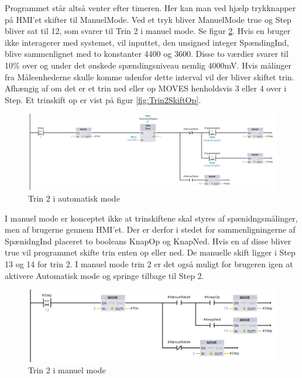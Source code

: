 Programmet står altså venter efter timeren. Her kan man ved hjælp trykknapper på HMI'et skifter til ManuelMode. Ved et tryk bliver ManuelMode true og Step bliver sat til 12, som svarer til Trin 2 i manuel mode. Se figur \ref{fig:Trin2ManuelMode}. Hvis en bruger ikke interagerer med systemet, vil inputtet, den unsigned integer SpændingInd, blive sammenlignet med to konstanter 4400 og 3600. Disse to værdier svarer til 10\% over og under det ønskede spændingsniveau nemlig 4000mV. Hvis målinger fra Måleenhederne skulle komme udenfor dette interval vil der bliver skiftet trin. Afhængig af om det er et trin ned eller op MOVES henholdsvis 3 eller 4 over i Step.
Et trinskift op er vist på figur \ref{fig:Trin2SkiftOp}.

\begin{figure}[H] %
	\centering
	\includegraphics[width=1\textwidth]{Figure/Trin2AutomatiskMode}
	\caption{Trin 2 i automatisk mode}
	\label{fig:Trin2AutomatiskMode}
\end{figure}

I manuel mode er konceptet ikke at trinskiftene skal styres af spænidngsmålinger, men af brugerne gennem HMI'et. Der er derfor i stedet for sammenligningerne af SpænidngInd placeret to booleans KnapOp og KnapNed. Hvis en af disse bliver true vil programmet skifte trin enten op eller ned. De manuelle skift ligger i Step 13 og 14 for trin 2. I manuel mode trin 2 er det også muligt for brugeren igen at aktivere Automatisk mode og springe tilbage til Step 2.

\begin{figure}[H] %
	\centering
	\includegraphics[width=1\textwidth]{Figure/Trin2ManuelMode}
	\caption{Trin 2 i manuel mode}
	\label{fig:Trin2ManuelMode}
\end{figure}

